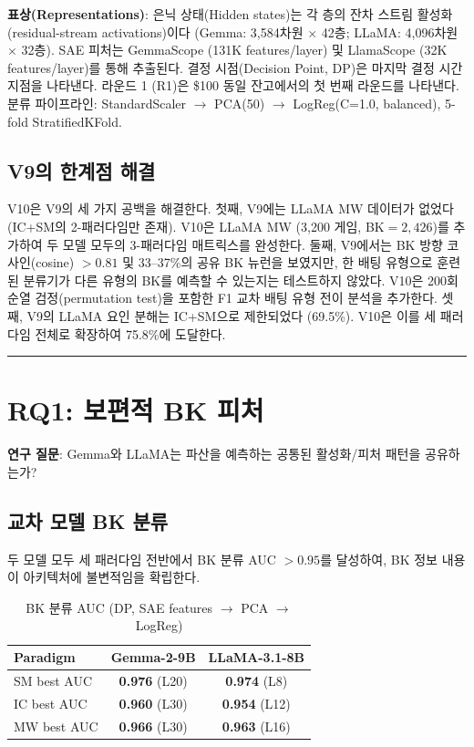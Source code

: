 \documentclass[11pt,a4paper]{article}
\begin{document}
\medskip\noindent\textbf{표상(Representations)}: 은닉 상태(Hidden states)는 각 층의 잔차 스트림 활성화(residual-stream activations)이다 (Gemma: 3,584차원 $\times$ 42층; LLaMA: 4,096차원 $\times$ 32층). SAE 피처는 GemmaScope (131K features/layer) 및 LlamaScope (32K features/layer)를 통해 추출된다. 결정 시점(Decision Point, DP)은 마지막 결정 시간 지점을 나타낸다. 라운드 1 (R1)은 \$100 동일 잔고에서의 첫 번째 라운드를 나타낸다. 분류 파이프라인: StandardScaler $\rightarrow$ PCA(50) $\rightarrow$ LogReg(C=1.0, balanced), 5-fold StratifiedKFold.

\subsection{V9의 한계점 해결}

V10은 V9의 세 가지 공백을 해결한다. 첫째, V9에는 LLaMA MW 데이터가 없었다 (IC+SM의 2-패러다임만 존재). V10은 LLaMA MW (3,200 게임, BK$=2{,}426$)를 추가하여 두 모델 모두의 3-패러다임 매트릭스를 완성한다. 둘째, V9에서는 BK 방향 코사인(cosine) $> 0.81$ 및 33--37\%의 공유 BK 뉴런을 보였지만, 한 배팅 유형으로 훈련된 분류기가 다른 유형의 BK를 예측할 수 있는지는 테스트하지 않았다. V10은 200회 순열 검정(permutation test)을 포함한 F1 교차 배팅 유형 전이 분석을 추가한다. 셋째, V9의 LLaMA 요인 분해는 IC+SM으로 제한되었다 (69.5\%). V10은 이를 세 패러다임 전체로 확장하여 75.8\%에 도달한다.

\bigskip\hrule\bigskip

\section{RQ1: 보편적 BK 피처}

\noindent\textbf{연구 질문}: Gemma와 LLaMA는 파산을 예측하는 공통된 활성화/피처 패턴을 공유하는가?

\subsection{교차 모델 BK 분류}

두 모델 모두 세 패러다임 전반에서 BK 분류 AUC $> 0.95$를 달성하여, BK 정보 내용이 아키텍처에 불변적임을 확립한다.

\begin{table}[H]
\centering
\caption{BK 분류 AUC (DP, SAE features $\rightarrow$ PCA $\rightarrow$ LogReg)}\label{tab:t2}
\footnotesize
\begin{tabular}{lcc}
\toprule
Paradigm & Gemma-2-9B & LLaMA-3.1-8B \\
\midrule
SM best AUC & \textbf{0.976} (L20) & \textbf{0.974} (L8) \\
IC best AUC & \textbf{0.960} (L30) & \textbf{0.954} (L12) \\
MW best AUC & \textbf{0.966} (L30) & \textbf{0.963} (L16) \\
\bottomrule
\end{tabular}
\end{table}
\end{document}
